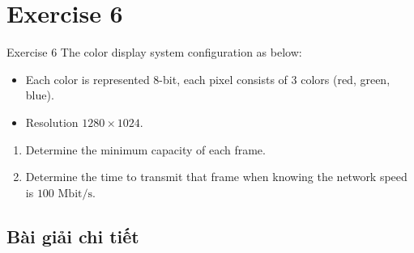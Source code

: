 \documentclass[a4paper]{article}
\numberwithin{figure}{section}
\numberwithin{table}{section}
\begin{document}
\pagebreak

\section{Exercise 6}

\begin{problembox}{Exercise 6}
The color display system configuration as below:
\begin{itemize}
    \item Each color is represented 8-bit, each pixel consists of 3 colors (red, green, blue).
    \item Resolution $1280 \times 1024$.
\end{itemize}
\begin{enumerate}[label=\textbf{\alph*.}]
    \item Determine the minimum capacity of each frame.
    \item Determine the time to transmit that frame when knowing the network speed is $100\text{ Mbit/s}$.
\end{enumerate}
\end{problembox}

\subsection{Bài giải chi tiết}
\end{document}
